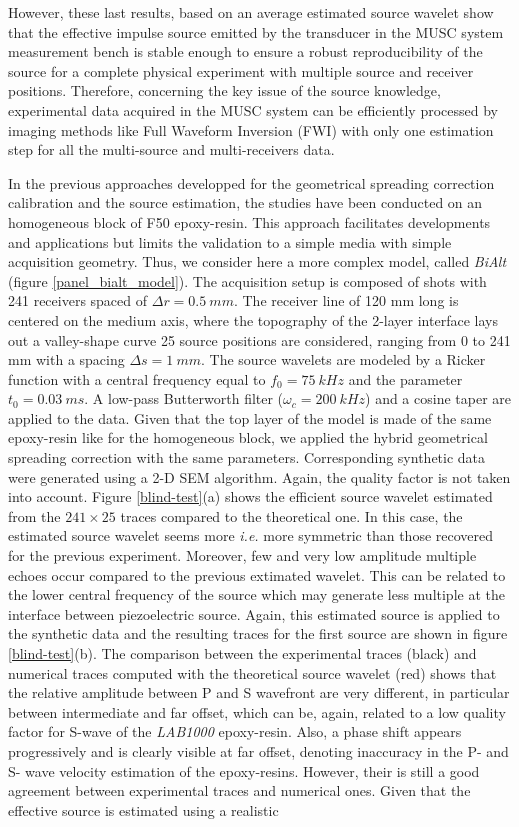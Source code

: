 \documentclass[manuscript,revised]{geophysics}
\newcommand{\twod}{2-D }
\newcommand{\bialt}{\textit{BiAlt} }
\begin{document}
\noindent However, these last results, based on an average estimated source wavelet show that the effective impulse source emitted by the transducer in the MUSC system measurement bench is stable enough to ensure a robust reproducibility of the source for a complete physical experiment with multiple source and receiver positions. Therefore, concerning the key issue of the source knowledge, experimental data acquired in the MUSC system can be efficiently processed by imaging methods like Full Waveform Inversion (FWI) with only one estimation step for all the multi-source and multi-receivers data.

\noindent In the previous approaches developped for the geometrical spreading correction calibration and the source estimation, the studies have been conducted on an homogeneous block of F50 epoxy-resin. This approach facilitates developments and applications but limits the validation to a simple media with simple acquisition geometry. Thus, we consider here a more complex model, called \bialt (figure \ref{panel_bialt_model}). The acquisition setup is composed of shots with 241 receivers spaced of $\Delta r=0.5\ mm$. The receiver line of 120 mm long is centered on the medium axis, where the topography of the 2-layer interface lays out a valley-shape curve 25 source positions are considered, ranging from 0 to 241 mm with a spacing $\Delta s=1\ mm$. The source wavelets are modeled by a Ricker function with a central frequency equal to $f_{0}=75\ kHz$ and the parameter $t_{0}=0.03\ ms$. A low-pass Butterworth filter ($\omega_{c}=200\ kHz$) and a cosine taper are applied to the data. Given that the top layer of the model is made of the same epoxy-resin like for the homogeneous block, we applied the hybrid geometrical spreading correction with the same parameters. Corresponding synthetic data were generated using a \twod  SEM algorithm. Again, the quality factor is not taken into account. Figure \ref{blind-test}(a) shows the efficient source wavelet estimated from the $241 \times 25$ traces compared to the theoretical one. In this case, the estimated source wavelet seems more \textit{i.e.} more symmetric than those recovered for the previous experiment. Moreover, few and very low amplitude multiple echoes occur compared to the previous extimated wavelet. This can be related to the lower central frequency of the source which may generate less multiple at the interface between piezoelectric source. Again, this estimated source is applied to the synthetic data and the resulting traces  for the first source are shown in figure \ref{blind-test}(b). The comparison between the experimental traces (black) and numerical traces computed with the theoretical source wavelet (red) shows that the relative amplitude between P and S wavefront are very different, in particular between intermediate and far offset, which can be, again, related to a low quality factor for S-wave of the \textit{LAB1000} epoxy-resin. Also, a phase shift appears progressively and is clearly visible at far offset, denoting inaccuracy in the P- and S- wave velocity estimation of the epoxy-resins. However, their is still a good agreement between experimental traces and numerical ones. Given that the effective source is estimated using a realistic 
\end{document}

